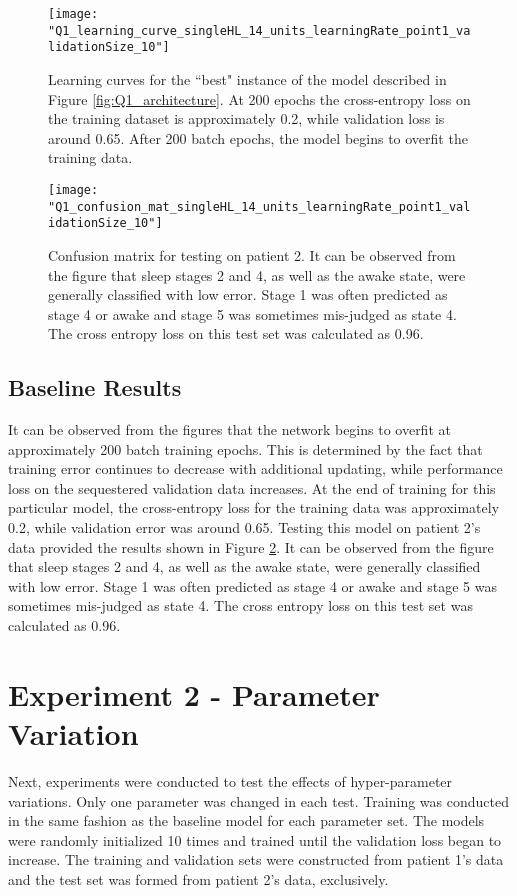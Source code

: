 \documentclass{article}[12 pt]
\begin{document}
\begin{center}
	\begin{figure}[H]
		\centering
		\texttt{[image: "Q1\_learning\_curve\_singleHL\_14\_units\_learningRate\_point1\_validationSize\_10"]}
		\caption{Learning curves for the ``best" instance of the model described in Figure \ref{fig:Q1_architecture}. At 200 epochs the cross-entropy loss on the training dataset is approximately 0.2, while validation loss is around 0.65. After 200 batch epochs, the model begins to overfit the training data.}
		\label{fig:Q1_learning_curve}
	\end{figure}
\end{center}

\begin{center}
	\begin{figure}[H]
		\centering
		\texttt{[image: "Q1\_confusion\_mat\_singleHL\_14\_units\_learningRate\_point1\_validationSize\_10"]}
		\caption{Confusion matrix for testing on patient 2.  It can be observed from the figure that sleep stages 2 and 4, as well as the awake state, were generally classified with low error.  Stage 1 was often predicted as stage 4 or awake and stage 5 was sometimes mis-judged as state 4. The cross entropy loss on this test set was calculated as 0.96.}
		\label{fig:Q1_confusion_matrix}
	\end{figure}
\end{center}

\subsection*{Baseline Results}
It can be observed from the figures that the network begins to overfit at approximately 200 batch training epochs.  This is determined by the fact that training error continues to decrease with additional updating, while performance loss on the sequestered validation data increases.  At the end of training for this particular model, the cross-entropy loss for the training data was approximately 0.2, while validation error was around 0.65.  Testing this model on patient 2's data provided the results shown in Figure \ref{fig:Q1_confusion_matrix}. It can be observed from the figure that sleep stages 2 and 4, as well as the awake state, were generally classified with low error.  Stage 1 was often predicted as stage 4 or awake and stage 5 was sometimes mis-judged as state 4. The cross entropy loss on this test set was calculated as 0.96.

\section*{Experiment 2 - Parameter Variation}
Next, experiments  were conducted to test the effects of hyper-parameter variations.  Only one parameter was changed in each test.  Training was conducted in the same fashion as the baseline model for each parameter set.  The models were randomly initialized 10 times and trained until the validation loss began to increase.  The training and validation sets were constructed from patient 1's data and the test set was formed from patient 2's data, exclusively. \newline
\end{document}
